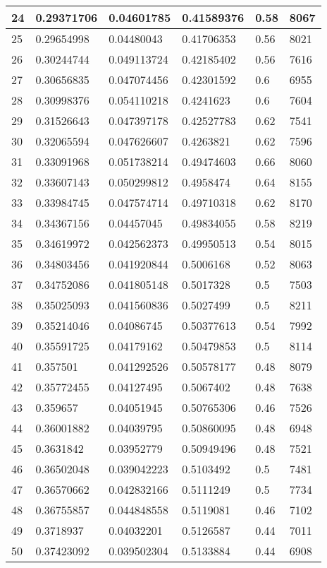 \begin{longtable}{|l|l|l|l|l|l|}
24 & 0.29371706 & 0.04601785 & 0.41589376 & 0.58 & 8067 \\ \hline 
25 & 0.29654998 & 0.04480043 & 0.41706353 & 0.56 & 8021 \\ \hline 
26 & 0.30244744 & 0.049113724 & 0.42185402 & 0.56 & 7616 \\ \hline 
27 & 0.30656835 & 0.047074456 & 0.42301592 & 0.6 & 6955 \\ \hline 
28 & 0.30998376 & 0.054110218 & 0.4241623 & 0.6 & 7604 \\ \hline 
29 & 0.31526643 & 0.047397178 & 0.42527783 & 0.62 & 7541 \\ \hline 
30 & 0.32065594 & 0.047626607 & 0.4263821 & 0.62 & 7596 \\ \hline 
31 & 0.33091968 & 0.051738214 & 0.49474603 & 0.66 & 8060 \\ \hline 
32 & 0.33607143 & 0.050299812 & 0.4958474 & 0.64 & 8155 \\ \hline 
33 & 0.33984745 & 0.047574714 & 0.49710318 & 0.62 & 8170 \\ \hline 
34 & 0.34367156 & 0.04457045 & 0.49834055 & 0.58 & 8219 \\ \hline 
35 & 0.34619972 & 0.042562373 & 0.49950513 & 0.54 & 8015 \\ \hline 
36 & 0.34803456 & 0.041920844 & 0.5006168 & 0.52 & 8063 \\ \hline 
37 & 0.34752086 & 0.041805148 & 0.5017328 & 0.5 & 7503 \\ \hline 
38 & 0.35025093 & 0.041560836 & 0.5027499 & 0.5 & 8211 \\ \hline 
39 & 0.35214046 & 0.04086745 & 0.50377613 & 0.54 & 7992 \\ \hline 
40 & 0.35591725 & 0.04179162 & 0.50479853 & 0.5 & 8114 \\ \hline 
41 & 0.357501 & 0.041292526 & 0.50578177 & 0.48 & 8079 \\ \hline 
42 & 0.35772455 & 0.04127495 & 0.5067402 & 0.48 & 7638 \\ \hline 
43 & 0.359657 & 0.04051945 & 0.50765306 & 0.46 & 7526 \\ \hline 
44 & 0.36001882 & 0.04039795 & 0.50860095 & 0.48 & 6948 \\ \hline 
45 & 0.3631842 & 0.03952779 & 0.50949496 & 0.48 & 7521 \\ \hline 
46 & 0.36502048 & 0.039042223 & 0.5103492 & 0.5 & 7481 \\ \hline 
47 & 0.36570662 & 0.042832166 & 0.5111249 & 0.5 & 7734 \\ \hline 
48 & 0.36755857 & 0.044848558 & 0.5119081 & 0.46 & 7102 \\ \hline 
49 & 0.3718937 & 0.04032201 & 0.5126587 & 0.44 & 7011 \\ \hline 
50 & 0.37423092 & 0.039502304 & 0.5133884 & 0.44 & 6908 \\ \hline 
\end{longtable}